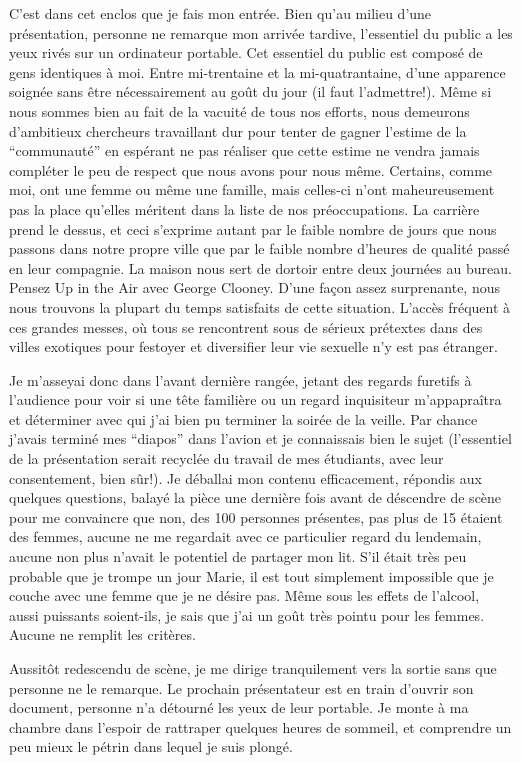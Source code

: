 C'est dans cet enclos que je fais mon entrée. Bien qu'au milieu d'une
présentation, personne ne remarque mon arrivée tardive, l'essentiel du
public a les yeux rivés sur un ordinateur portable. Cet essentiel du
public est composé de gens identiques à moi. Entre mi-trentaine et la
mi-quatrantaine, d'une apparence soignée sans être nécessairement au
goût du jour (il faut l'admettre!). Même si nous sommes bien au fait
de la vacuité de tous nos efforts, nous demeurons d'ambitieux
chercheurs travaillant dur pour tenter de gagner l'estime de la
“communauté” en espérant ne pas réaliser que cette estime ne vendra
jamais compléter le peu de respect que nous avons pour nous
même. Certains, comme moi, ont une femme ou même une famille, mais
celles-ci n'ont maheureusement pas la place qu'elles méritent dans la
liste de nos préoccupations.  La carrière prend le dessus, et ceci
s'exprime autant par le faible nombre de jours que nous passons dans
notre propre ville que par le faible nombre d'heures de qualité passé
en leur compagnie. La maison nous sert de dortoir entre deux journées
au bureau. Pensez Up in the Air avec George Clooney. D'une façon assez
surprenante, nous nous trouvons la plupart du temps satisfaits de
cette situation. L'accès fréquent à ces grandes messes, où tous se rencontrent
sous de sérieux prétextes dans des villes exotiques pour festoyer et
diversifier leur vie sexuelle n'y est pas étranger.

Je m'asseyai donc dans l'avant dernière rangée, jetant des regards
furetifs à l'audience pour voir si une tête familière ou un regard
inquisiteur m'appapraîtra et déterminer avec qui j'ai bien pu terminer
la soirée de la veille. Par chance j'avais terminé mes “diapos” dans
l'avion et je connaissais bien le sujet (l'essentiel de la
présentation serait recyclée du travail de mes étudiants, avec leur
consentement, bien sûr!). Je déballai mon contenu efficacement,
répondis aux quelques questions, balayé la pièce une dernière fois
avant de déscendre de scène pour me convaincre que non, des 100
personnes présentes, pas plus de 15 étaient des femmes, aucune ne me
regardait avec ce particulier regard du lendemain, aucune non plus
n'avait le potentiel de partager mon lit. S'il était très peu probable
que je trompe un jour Marie, il est tout simplement impossible que je
couche avec une femme que je ne désire pas. Même sous les effets de
l'alcool, aussi puissants soient-ils, je sais que j'ai un goût très
pointu pour les femmes. Aucune ne remplit les critères.

Aussitôt redescendu de scène, je me dirige tranquilement vers la
sortie sans que personne ne le remarque. Le prochain présentateur est
en train d'ouvrir son document, personne n'a détourné les yeux de leur
portable. Je monte à ma chambre dans l'espoir de rattraper quelques
heures de sommeil, et comprendre un peu mieux le pétrin dans lequel je
suis plongé.